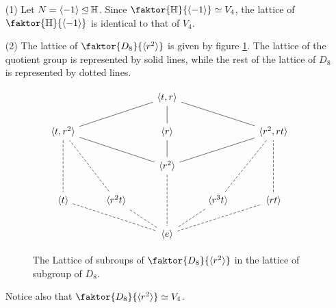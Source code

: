 \begin{example}\label{example_3.7}
  \begin{enumerate}
    \item[(1)] Let $N=\langle -1 \rangle \unlhd \mathbb{H}$. Since
      $\faktor{\Hb}{\langle -1 \rangle} \simeq V_4$, the lattice of
      $\faktor{\Hb}{\langle -1 \rangle}$ is identical to that of $V_4$.

    \item[(2)] The lattice of $\faktor{D_8}{\langle r^2 \rangle}$ is given by
      figure \ref{figure_3.4}. The lattice of the quotient group is
      represented by solid lines, while the rest of the lattice of $D_8$
      is represented by dotted lines.

      \begin{figure}[h]
        \[\begin{tikzcd}
  && {\langle t,r \rangle} \\
          {\langle t,r^2 \rangle} && {\langle r \rangle} && {\langle r^2,rt \rangle} \\
                                  && {\langle r^2 \rangle} \\
          {\langle t \rangle} & {\langle r^2t \rangle} && {\langle r^3t \rangle} & {\langle rt \rangle} \\
                              && {\langle e \rangle}
                              \arrow[no head, from=1-3, to=2-1]
                              \arrow[no head, from=2-1, to=3-3]
                              \arrow[no head, from=3-3, to=2-5]
                              \arrow[no head, from=2-5, to=1-3]
                              \arrow[no head, from=1-3, to=2-3]
                              \arrow[no head, from=2-3, to=3-3]
                              \arrow[dashed, no head, from=3-3, to=5-3]
                              \arrow[dashed, no head, from=2-1, to=4-1]
                              \arrow[dashed, no head, from=4-1, to=5-3]
                              \arrow[dashed, no head, from=5-3, to=4-5]
                              \arrow[dashed, no head, from=4-5, to=2-5]
                              \arrow[dashed, no head, from=2-5, to=4-4]
                              \arrow[dashed, no head, from=4-4, to=5-3]
                              \arrow[dashed, no head, from=5-3, to=4-2]
                              \arrow[dashed, no head, from=4-2, to=2-1]
        \end{tikzcd}\]
        \caption{The Lattice of subroups of $\faktor{D_8}{\langle r^2
          \rangle}$ in the lattice of subgroup of $D_8$.}
        \label{figure_3.4}
      \end{figure}
      Notice also that $\faktor{D_8}{\langle r^2 \rangle} \simeq V_4$.
  \end{enumerate}
\end{example}
